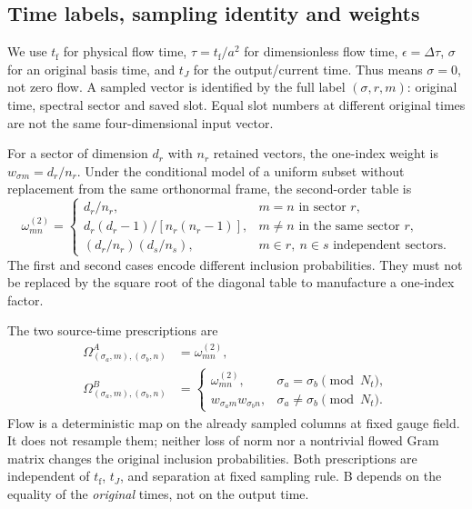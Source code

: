 \documentclass[11pt]{article}
\numberwithin{equation}{section}
\newcommand{\tf}{t_{\mathrm f}}
\begin{document}
\subsection{Time labels, sampling identity and weights}

We use \(\tf\) for physical flow time,
\(\tau=\tf/a^2\) for dimensionless flow time,
\(\epsilon=\Delta\tau\), \(\sigma\) for an original basis time, and
\(t_J\) for the output/current time. Thus  means
\(\sigma=0\), not zero flow. A sampled vector is identified by the full
label \((\sigma,r,m)\): original time, spectral sector and saved slot.
Equal slot numbers at different original times are not the same
four-dimensional input vector.

For a sector of dimension \(d_r\) with \(n_r\) retained vectors, the
one-index weight is \(w_{\sigma m}=d_r/n_r\). Under the conditional model
of a uniform subset without replacement from the same orthonormal frame,
the second-order table is
\begin{equation}
 \omega^{(2)}_{mn}=
 \begin{cases}
 d_r/n_r,&m=n\text{ in sector }r,\\
 d_r(d_r-1)/[n_r(n_r-1)],&m\ne n\text{ in the same sector }r,\\
 (d_r/n_r)(d_s/n_s),&m\in r,\ n\in s\text{ independent sectors}.
 \end{cases}
 \label{eq:omega-second-oct15}
\end{equation}
The first and second cases encode different inclusion probabilities.
They must not be replaced by the square root of the diagonal table to
manufacture a one-index factor.

The two source-time prescriptions are
\begin{align}
 \Omega^A_{(\sigma_a,m),(\sigma_b,n)}&=\omega^{(2)}_{mn},\\
 \Omega^B_{(\sigma_a,m),(\sigma_b,n)}&=
 \begin{cases}
 \omega^{(2)}_{mn},&\sigma_a=\sigma_b\pmod {N_t},\\
 w_{\sigma_a m}w_{\sigma_b n},&\sigma_a\ne\sigma_b\pmod {N_t}.
 \end{cases}
 \label{eq:scheme-B-oct15}
\end{align}
Flow is a deterministic map on the already sampled columns at fixed gauge
field. It does not resample them; neither loss of norm nor a nontrivial
flowed Gram matrix changes the original inclusion probabilities.
Both prescriptions are independent of \(\tf\), \(t_J\), and separation
at fixed sampling rule. B depends on the equality of the \emph{original}
times, not on the output time.
\end{document}
